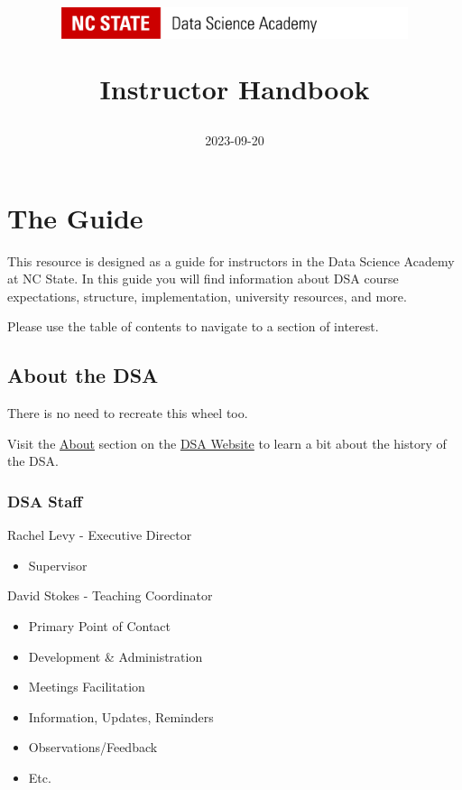 \documentclass[
]{book}
\title{\includegraphics[width=4in,height=\textheight]{DSA Logo.png}

Instructor Handbook}
\author{2023-09-20}
\date{}
\providecommand{\tightlist}{%
  \setlength{\itemsep}{0pt}\setlength{\parskip}{0pt}}
\begin{document}
\maketitle

{
\setcounter{tocdepth}{1}
\tableofcontents
}
\hypertarget{the-guide}{%
\chapter{The Guide}\label{the-guide}}

This resource is designed as a guide for instructors in the Data Science Academy at NC State. In this guide you will find information about DSA course expectations, structure, implementation, university resources, and more.

Please use the table of contents to navigate to a section of interest.

\hypertarget{about-the-dsa}{%
\section{About the DSA}\label{about-the-dsa}}

There is no need to recreate this wheel too.

Visit the \href{https://datascienceacademy.ncsu.edu/about/}{About} section on the \href{https://datascienceacademy.ncsu.edu/}{DSA Website} to learn a bit about the history of the DSA.

\hypertarget{dsa-staff}{%
\subsection{DSA Staff}\label{dsa-staff}}

Rachel Levy - Executive Director

\begin{itemize}
\tightlist
\item
  Supervisor
\end{itemize}

David Stokes - Teaching Coordinator

\begin{itemize}
\tightlist
\item
  Primary Point of Contact
\item
  Development \& Administration
\item
  Meetings Facilitation
\item
  Information, Updates, Reminders
\item
  Observations/Feedback
\item
  Etc.
\end{itemize}
\end{document}
